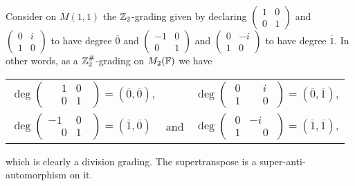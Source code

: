 \begin{ex}\label{ex:supertransp-graded}
	Consider on $M(1,1)$ the $\mathbb{Z}_2$-grading given by declaring $\begin{pmatrix}
			1 & 0 \\
			0 & 1
		\end{pmatrix}$ and
	$\begin{pmatrix}
			0 & i \\
			1 & 0
		\end{pmatrix}$ to have degree $\overline 0$ and
	$\begin{pmatrix}
			-1 & 0 \\
			0  & 1
		\end{pmatrix}$ and
	$\begin{pmatrix}
			0 & -i \\
			1 & 0
		\end{pmatrix}$ to have degree $\overline 1$. In other words, as a $\mathbb{Z}_2^\#$-grading on $M_2(\mathbb{F})$ we have\\
	\begin{center}
		\begin{tabular}{ l c r }
			$\deg \begin{pmatrix}
					\phantom{-}1 & 0\phantom{..} \\
					\phantom{-}0 & 1\phantom{..}
				\end{pmatrix} = (\bar 0, \bar 0)$, &                                                       & $\deg \begin{pmatrix}
					\phantom{.}0 & \phantom{-}i\phantom{.} \\
					\phantom{.}1 & \phantom{-}0\phantom{.}
				\end{pmatrix} = (\bar 0, \bar 1)$, \\
			$\deg \begin{pmatrix}
					-1           & 0\phantom{..} \\
					\phantom{-}0 & 1\phantom{..}
				\end{pmatrix} = (\bar 1, \bar 0)$  &
			and
			                                                      & $\deg \begin{pmatrix}
					\phantom{.}0 & -i\phantom{.}           \\
					\phantom{.}1 & \phantom{-}0\phantom{.}
				\end{pmatrix} = (\bar 1, \bar 1)$,
		\end{tabular}
	\end{center}
	which is clearly a division grading. The supertranspose is a super-anti-automorphism on it.
\end{ex}

